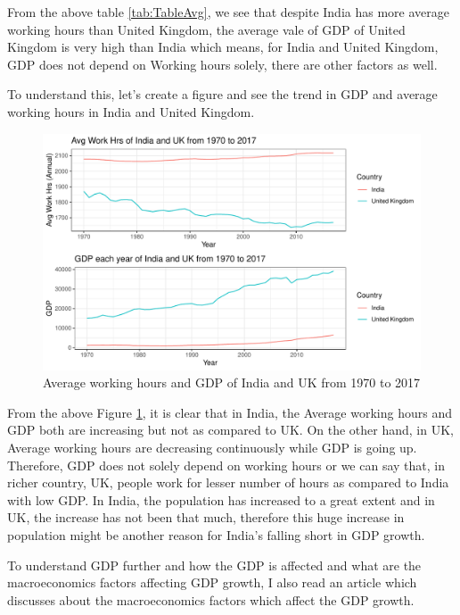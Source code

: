 \documentclass[11pt,a4paper,]{article}
\begin{document}
From the above table \ref{tab:TableAvg}, we see that despite India has more average working hours than United Kingdom, the average vale of GDP of United Kingdom is very high than India which means, for India and United Kingdom, GDP does not depend on Working hours solely, there are other factors as well.

To understand this, let's create a figure and see the trend in GDP and average working hours in India and United Kingdom.

\begin{figure}

{\centering \includegraphics{report_files/figure-latex/FigTrend-1} 

}

\caption{Average working hours and GDP of India and UK from 1970 to 2017}\label{fig:FigTrend}
\end{figure}

From the above Figure \ref{fig:FigTrend}, it is clear that in India, the Average working hours and GDP both are increasing but not as compared to UK. On the other hand, in UK, Average working hours are decreasing continuously while GDP is going up. Therefore, GDP does not solely depend on working hours or we can say that, in richer country, UK, people work for lesser number of hours as compared to India with low GDP. In India, the population has increased to a great extent and in UK, the increase has not been that much, therefore this huge increase in population might be another reason for India's falling short in GDP growth.

To understand GDP further and how the GDP is affected and what are the macroeconomics factors affecting GDP growth, I also read an article \textcite{article2} which discusses about the macroeconomics factors which affect the GDP growth.
\end{document}
